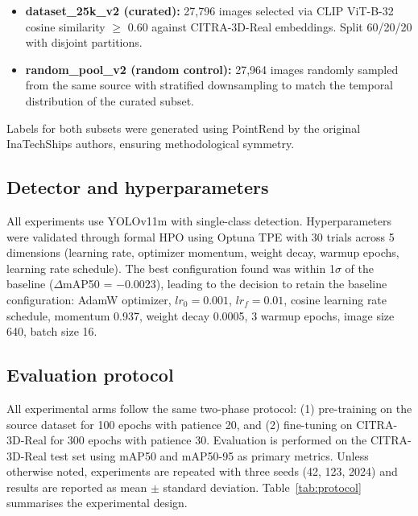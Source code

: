 \documentclass[a4paper,fleqn]{cas-dc}
\begin{document}
\begin{itemize}
    \item \textbf{dataset\_25k\_v2 (curated):} 27,796 images selected via CLIP ViT-B-32 cosine similarity $\geq$ 0.60 against CITRA-3D-Real embeddings. Split 60/20/20 with disjoint partitions.
    \item \textbf{random\_pool\_v2 (random control):} 27,964 images randomly sampled from the same source with stratified downsampling to match the temporal distribution of the curated subset.
\end{itemize}

Labels for both subsets were generated using PointRend \citep{kirillov2020pointrend} by the original InaTechShips authors, ensuring methodological symmetry.

\subsection{Detector and hyperparameters}\label{sec:detector}

All experiments use YOLOv11m \citep{jocher2023ultralytics} with single-class detection. Hyperparameters were validated through formal HPO using Optuna TPE \citep{akiba2019optuna} with 30 trials across 5 dimensions (learning rate, optimizer momentum, weight decay, warmup epochs, learning rate schedule). The best configuration found was within 1$\sigma$ of the baseline ($\Delta$mAP50 = $-$0.0023), leading to the decision to retain the baseline configuration: AdamW optimizer, $lr_0 = 0.001$, $lr_f = 0.01$, cosine learning rate schedule, momentum 0.937, weight decay 0.0005, 3 warmup epochs, image size 640, batch size 16.

\subsection{Evaluation protocol}\label{sec:protocol}

All experimental arms follow the same two-phase protocol: (1) pre-training on the source dataset for 100 epochs with patience 20, and (2) fine-tuning on CITRA-3D-Real for 300 epochs with patience 30. Evaluation is performed on the CITRA-3D-Real test set using mAP50 and mAP50-95 as primary metrics. Unless otherwise noted, experiments are repeated with three seeds (42, 123, 2024) and results are reported as mean $\pm$ standard deviation. Table~\ref{tab:protocol} summarises the experimental design.
\end{document}
